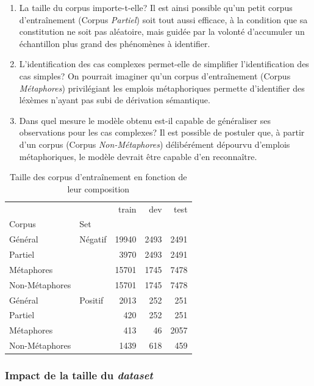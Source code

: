 \begin{enumerate}
    \item La taille du corpus importe-t-elle? Il est ainsi possible qu'un petit corpus d'entraînement (Corpus \textit{Partiel}) soit tout aussi efficace, à la condition que sa constitution ne soit pas aléatoire, mais guidée par la volonté d'accumuler un échantillon plus grand des phénomènes à identifier.
    \item L'identification des cas complexes permet-elle de simplifier l'identification des cas simples? On pourrait imaginer qu'un corpus d'entraînement (Corpus \textit{Métaphores}) privilégiant les emplois métaphoriques permette d'identifier des léxèmes n'ayant pas subi de dérivation sémantique.
    \item Dans quel mesure le modèle obtenu est-il capable de généraliser ses observations pour les cas complexes? Il est possible de postuler que, à partir d'un corpus (Corpus \textit{Non-Métaphores}) délibérément dépourvu d'emplois métaphoriques, le modèle devrait être capable d'en reconnaître.
\end{enumerate}

\begin{table}[]
    \centering
    \begin{tabular}{ll|rrr}
    \toprule
            &         &  train &   dev &  test \\
    Corpus & Set &        &       &       \\
    \midrule
    Général & Négatif &  19940 &  2493 &  2491 \\
    Partiel &  &   3970 &  2493 &  2491 \\
    Métaphores &  &  15701 &  1745 &  7478 \\
    Non-Métaphores &  &  15701 &  1745 &  7478 \\ \midrule
    Général & Positif &   2013 &   252 &   251 \\
    Partiel &  &    420 &   252 &   251 \\
    Métaphores &  &    413 &    46 &  2057 \\
    Non-Métaphores &  &   1439 &   618 &   459 \\
    \bottomrule
    \end{tabular}
    \caption{Taille des corpus d'entraînement en fonction de leur composition}
    \label{tab:chap4:dataset-sizes}
\end{table}

\subsubsection{Impact de la taille du \textit{dataset}}


